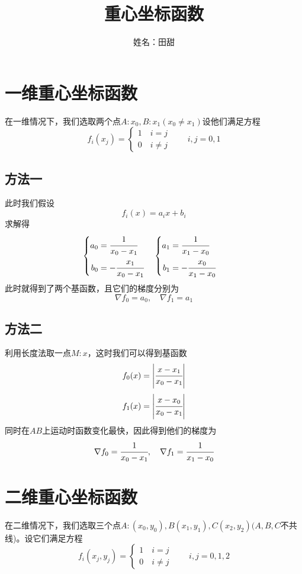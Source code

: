 \documentclass[12pt,a4paper]{article}
\title{重心坐标函数}
\author{姓名：田甜}
\date{\chntoday}
\begin{document}
\maketitle
\newpage
\section{一维重心坐标函数}
在一维情况下，我们选取两个点$A:x_0,B:x_1(x_0 \neq x_1)$设他们满足方程\begin{equation}
f_i(x_j)=\begin{cases}1 \quad i=j
\\ 0\quad i\neq j\end{cases}\qquad i,j=0,1
\label{eqaution1}
\end{equation}
\subsection{方法一}
此时我们假设\begin{equation}
f_i(x)=a_ix+b_i
\label{eqaution2}
\end{equation}
求解得$$\begin{cases}
\begin{aligned}a_0&=\cfrac{1}{x_0-x_1}\\  b_0&=-\cfrac{x_1}{x_0-x_1}\end{aligned}
\end{cases}
\begin{cases}\begin{aligned}a_1&=\cfrac{1}{x_1-x_0}\\  b_1&=-\cfrac{x_0}{x_1-x_0}\end{aligned}\end{cases}$$
此时就得到了两个基函数，且它们的梯度分别为$$\nabla f_0=a_0,\quad \nabla f_1=a_1$$
\subsection{方法二}
利用长度法取一点$M:x$，这时我们可以得到基函数
\begin{equation}
f_0(x)=\left| \cfrac{x-x_1}{x_0-x_1}\right|
\end{equation}
\begin{equation}
f_1(x)=\left| \cfrac{x-x_0}{x_0-x_1}\right|
\end{equation}
同时在$AB$上运动时函数变化最快，因此得到他们的梯度为$$\nabla f_0=\cfrac{1}{x_0-x_1},\quad \nabla f_1=\cfrac{1}{x_1-x_0}$$
\section{二维重心坐标函数}
在二维情况下，我们选取三个点$A:(x_0,y_0),B(x_1,y_1),C(x_2,y_2)(A,B,C$不共线)。设它们满足方程\begin{equation}
f_i(x_j,y_j)=\begin{cases}1 \quad i=j
\\ 0\quad i\neq j\end{cases}\qquad i,j=0,1,2
\end{equation}
\end{document}
